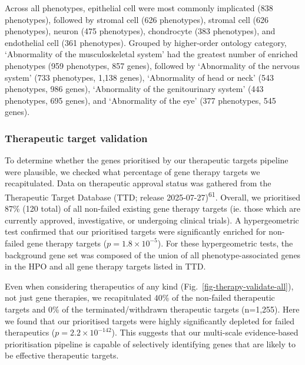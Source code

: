 \documentclass[
]{article}
\begin{document}
Across all phenotypes, epithelial cell were most commonly implicated
(838 phenotypes), followed by stromal cell (626 phenotypes), stromal
cell (626 phenotypes), neuron (475 phenotypes), chondrocyte (383
phenotypes), and endothelial cell (361 phenotypes). Grouped by
higher-order ontology category, `Abnormality of the musculoskeletal
system' had the greatest number of enriched phenotypes (959 phenotypes,
857 genes), followed by `Abnormality of the nervous system' (733
phenotypes, 1,138 genes), `Abnormality of head or neck' (543 phenotypes,
986 genes), `Abnormality of the genitourinary system' (443 phenotypes,
695 genes), and `Abnormality of the eye' (377 phenotypes, 545 genes).

\subsubsection{Therapeutic target
validation}\label{therapeutic-target-validation}

To determine whether the genes prioritised by our therapeutic targets
pipeline were plausible, we checked what percentage of gene therapy
targets we recapitulated. Data on therapeutic approval status was
gathered from the Therapeutic Target Database (TTD; release
2025-07-27)\textsuperscript{61}. Overall, we prioritised \(87\)\% (120
total) of all non-failed existing gene therapy targets (ie. those which
are currently approved, investigative, or undergoing clinical trials). A
hypergeometric test confirmed that our prioritised targets were
significantly enriched for non-failed gene therapy targets
(\(p=\)\(1.8 \times 10^{-5}\)). For these hypergeometric tests, the
background gene set was composed of the union of all
phenotype-associated genes in the HPO and all gene therapy targets
listed in TTD.

Even when considering therapeutics of any kind
(Fig.~\ref{fig-therapy-validate-all}), not just gene therapies, we
recapitulated \(40\)\% of the non-failed therapeutic targets and 0\% of
the terminated/withdrawn therapeutic targets (n=1,255). Here we found
that our prioritised targets were highly significantly depleted for
failed therapeutics (\(p=\)\(2.2 \times 10^{-142}\)). This suggests that
our multi-scale evidence-based prioritisation pipeline is capable of
selectively identifying genes that are likely to be effective
therapeutic targets.
\end{document}
